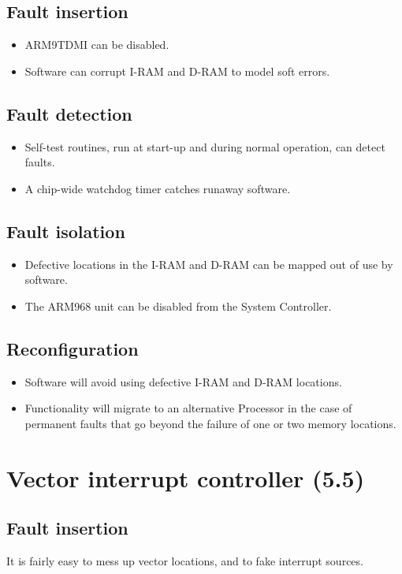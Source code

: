 \documentclass[oneside, a4paper, 11pt]{memoir}
\newenvironment{itmz}{
	\begin{itemize}
		\setlength{\itemsep}{0pt}
		\setlength{\parskip}{0pt}
	}{\end{itemize}}
\begin{document}
\subsection*{Fault insertion}
\begin{itmz}
\item ARM9TDMI can be disabled.
\item Software can corrupt I-RAM and D-RAM to model soft errors.
\end{itmz}
\subsection*{Fault detection}
\begin{itmz}
\item Self-test routines, run at start-up and during normal operation, can detect faults.
\item A chip-wide watchdog timer catches runaway software.
\end{itmz}
\subsection*{Fault isolation}
\begin{itmz}
\item Defective locations in the I-RAM and D-RAM can be mapped out of use by software.
\item The ARM968 unit can be disabled from the System Controller.
\end{itmz}
\subsection*{Reconfiguration}
\begin{itmz}
\item Software will avoid using defective I-RAM and D-RAM locations.
\item Functionality will migrate to an alternative Processor in the case of permanent faults that go
beyond the failure of one or two memory locations.
\end{itmz}

\section{Vector interrupt controller (5.5)}
\subsection*{Fault insertion}
It is fairly easy to mess up vector locations, and to fake interrupt sources.
\end{document}
